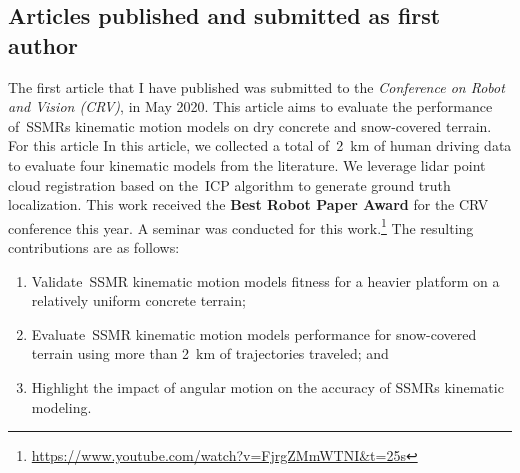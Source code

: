 \documentclass[12pt,letterpaper,oneside]{article}
\begin{document}

\subsection{Articles published and submitted as first author}
\label{sec:first_author}
\begin{center}
	\textbf{}
\end{center}
The first article that I have published was submitted to the \emph{Conference on Robot and Vision (CRV)}, in May 2020.
This article aims to evaluate the performance of~\acp{SSMR} kinematic motion models on dry concrete and snow-covered terrain.
For this article
In this article, we collected a total of~\SI{2}{\kilo\meter} of human driving data to evaluate four kinematic models from the literature.
We leverage lidar point cloud registration based on the~\ac{ICP} algorithm to generate ground truth localization.
This work received the \textbf{Best Robot Paper Award} for the CRV conference this year.
A seminar was conducted for this work.\footnote{\url{https://www.youtube.com/watch?v=FjrgZMmWTNI&t=25s}}
The resulting contributions are as follows:
\begin{enumerate}
	\item Validate~\ac{SSMR} kinematic motion models fitness for a heavier platform on a relatively uniform concrete terrain;
	\item Evaluate~\ac{SSMR} kinematic motion models performance for snow-covered terrain using more than \SI{2}{\kilo\meter} of trajectories traveled; and
	\item Highlight the impact of angular motion on the accuracy of \acp{SSMR} kinematic modeling.
\end{enumerate}
\end{document}
